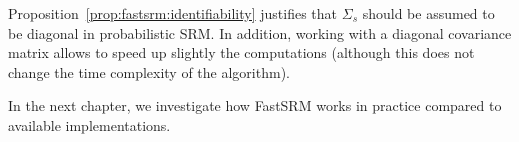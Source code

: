 Proposition~\eqref{prop:fastsrm:identifiability} justifies that
$\Sigma_s$ should be assumed to be diagonal in probabilistic SRM.
In addition, working with a diagonal covariance matrix allows to speed up
slightly the computations (although this does not change the time complexity of
the algorithm).

In the next chapter, we investigate how FastSRM works in practice compared to
available implementations.
